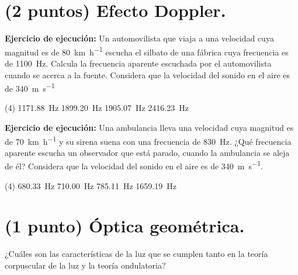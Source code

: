 \documentclass[12pt, letter]{exam}
\begin{document}
\begin{questions}
    \section{(2 puntos) Efecto Doppler.}

    \question \label{Ejercicio_04} \textbf{Ejercicio de ejecución: } Un automovilista que viaja a una velocidad cuya magnitud es de \SI{80}{\kilo\meter\per\hour} escucha el silbato de una fábrica cuya frecuencia es de \SI{1100}{\hertz}. Calcula la frecuencia aparente escuchada por el automovilista cuando se acerca a la fuente. Considera que la velocidad del sonido en el aire es de \SI{340}{\meter\per\second}
    \begin{tasks}(4)
        \task \SI{1171.88}{\hertz}
        \task \SI{1899.20}{\hertz}
        \task \SI{1905.07}{\hertz}
        \task \SI{2416.23}{\hertz}
    \end{tasks}
    \question \label{Ejercicio_05} \textbf{Ejercicio de ejecución: } Una ambulancia lleva una velocidad cuya magnitud es de \SI{70}{\kilo\meter\per\hour} y su sirena suena con una frecuencia de \SI{830}{\hertz}. ¿Qué frecuencia aparente escucha un observador que está parado, cuando la ambulancia se aleja de él? Considera que la velocidad del sonido en el aire es de \SI{340}{\meter\per\second}.
    \begin{tasks}(4)
        \task \SI{680.33}{\hertz}
        \task \SI{710.00}{\hertz}
        \task \SI{785.11}{\hertz}
        \task \SI{1659.19}{\hertz}
    \end{tasks}

    \section{(1 punto) Óptica geométrica.}

    \question ¿Cuáles son las características de la luz que se cumplen tanto en la teoría corpuscular de la luz y la teoría ondulatoria?
    {\renewcommand{\thepartno}{\Alph{partno}}
    }
\end{questions}
\end{document}
